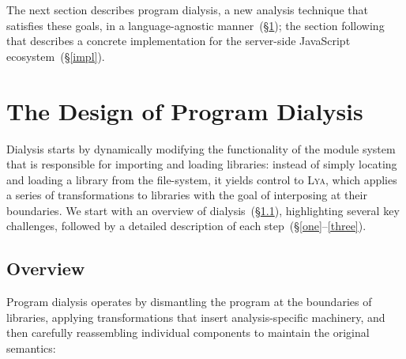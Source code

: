 \documentclass[letterpaper,twocolumn,10pt]{article}
\newcommand{\sx}[1]{(\S\ref{#1})}
\newcommand{\sys}{{\scshape Lya}\xspace}
\begin{document}
The next section describes program dialysis, a new analysis technique that satisfies these goals, in a language-agnostic manner~\sx{design};
  the section following that describes a concrete implementation for the server-side JavaScript ecosystem~\sx{impl}.

\section{The Design of Program Dialysis}
\label{design}

Dialysis starts by dynamically modifying the functionality of the module system that is responsible for importing and loading libraries:
  instead of simply locating and loading a library from the file-system, it yields control to \sys, which applies a series of transformations to libraries with the goal of interposing at their boundaries.
We start with an overview of dialysis~\sx{overview}, highlighting several key challenges, followed by a detailed description of each step~(\S\ref{one}--\ref{three}).

\subsection{Overview}
\label{overview}

Program dialysis operates by
  dismantling the program at the boundaries of libraries,
  applying transformations that insert analysis-specific machinery, and then carefully 
  reassembling individual components to maintain the original semantics:
\end{document}
